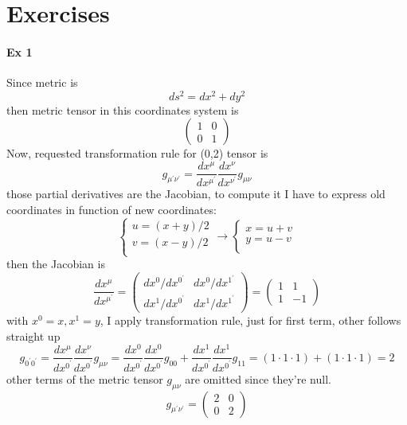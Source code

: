 \chapter{Exercises}
\subsubsection{Ex 1}
Since metric is \[
ds^{2}= dx^{2} +dy^{2}
\]
then metric tensor in this coordinates system is
\[
\begin{pmatrix}
1 & 0 \\
0 & 1
\end{pmatrix} 
\]
Now, requested transformation rule for (0,2) tensor is
\[
g_{\mu ^{\prime }\nu ^{\prime }} = \frac{d x^{\mu }}{d x^{\mu ^{\prime }}} \frac{d x^{\nu }}{d x^{\nu ^{\prime }}} g_{\mu \nu }
\]
those partial derivatives are the Jacobian, to compute it I have to express old coordinates in function of new coordinates:
\[
\begin{cases}
u = \left( x+y \right)/2 \\
v = \left( x-y \right)/2 \\
\end{cases} \to 
\begin{cases}
x = u+v \\
y = u-v \\
\end{cases}
\]
then the Jacobian is 
\[
\frac{d x^{\mu }}{d x^{\mu ^{\prime }}} = \begin{pmatrix}
dx^{0}/dx^{0^{\prime }} & dx^{0}/dx^{1^{\prime }} \\
dx^{1}/dx^{0^{\prime }} & dx^{1}/dx^{1^{\prime }}
\end{pmatrix} = \begin{pmatrix}
1 & 1 \\
1 & -1
\end{pmatrix} 
\]
with $x^{0}=x, x^{1} = y$, I apply transformation rule, just for first term, other follows straight up
\[
g_{0^{\prime }0^{\prime }} = \frac{d x^{\mu }}{d x^{0^{\prime }}}\frac{d x^{\nu }}{d x^{0^{\prime }}} g_{\mu \nu } = \frac{d x^{0}}{d x^{0^{\prime }}}\frac{d x^{0}}{d x^{0^{\prime }}} g_{00} + \frac{d x^{1}}{d x^{0^{\prime }}}\frac{d x^{1}}{d x^{0^{\prime }}} g_{11} = \left( 1\cdot1\cdot1 \right) + \left( 1\cdot1\cdot1 \right) = 2
\]
other terms of the metric tensor $g_{\mu \nu }$ are omitted since they're null. 
\[
g_{\mu ^{\prime }\nu ^{\prime }} = \begin{pmatrix}
2 & 0 \\
0 & 2
\end{pmatrix} 
\]

